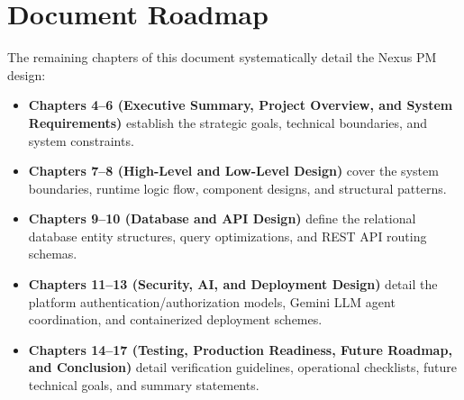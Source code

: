 \section*{Document Roadmap}
The remaining chapters of this document systematically detail the Nexus PM design:
\begin{itemize}
    \item \textbf{Chapters 4--6 (Executive Summary, Project Overview, and System Requirements)} establish the strategic goals, technical boundaries, and system constraints.
    \item \textbf{Chapters 7--8 (High-Level and Low-Level Design)} cover the system boundaries, runtime logic flow, component designs, and structural patterns.
    \item \textbf{Chapters 9--10 (Database and API Design)} define the relational database entity structures, query optimizations, and REST API routing schemas.
    \item \textbf{Chapters 11--13 (Security, AI, and Deployment Design)} detail the platform authentication/authorization models, Gemini LLM agent coordination, and containerized deployment schemes.
    \item \textbf{Chapters 14--17 (Testing, Production Readiness, Future Roadmap, and Conclusion)} detail verification guidelines, operational checklists, future technical goals, and summary statements.
\end{itemize}
